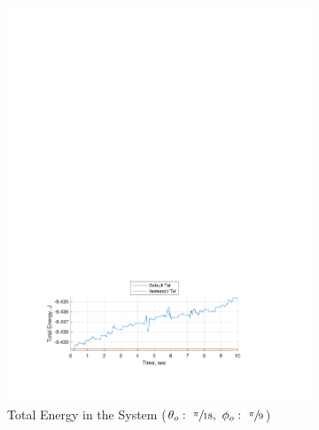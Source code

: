 \documentclass[12pt]{report}
\begin{document}
\begin{flushleft}
\begin{figure}[!htp]
\begin{subfigure}[t]{\textwidth}
  \includegraphics[center,width=.9\textwidth]{Energy2}
  \caption{Total Energy in the System ($\theta_o:~\sfrac{\pi}{18},~\phi_o:~\sfrac{\pi}{9}$)}
  \label{fig:Energy2}
\end{subfigure}
\begin{subfigure}[t]{\textwidth}

\end{subfigure}
\end{figure}
\end{flushleft}
\end{document}
